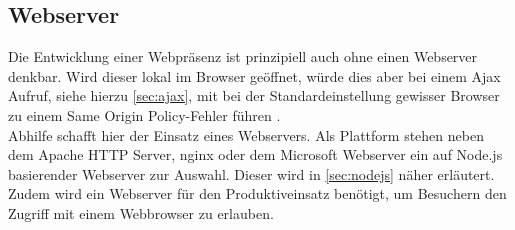 \subsection{Webserver}
\label{sec:webserver}
Die Entwicklung einer Webpräsenz ist prinzipiell auch ohne einen Webserver denkbar. Wird dieser lokal im Browser geöffnet, würde dies aber bei einem Ajax Aufruf, siehe hierzu \autoref{sec:ajax}, mit bei der Standardeinstellung gewisser Browser zu einem Same Origin Policy-Fehler führen \cite[S. 45  f.]{ste15}.\\
Abhilfe schafft hier der Einsatz eines Webservers. Als Plattform stehen neben dem Apache HTTP Server, nginx oder dem Microsoft Webserver ein auf Node.js basierender Webserver zur Auswahl. Dieser wird in \autoref{sec:nodejs} näher erläutert. \\
Zudem wird ein Webserver für den Produktiveinsatz benötigt, um Besuchern den Zugriff mit einem Webbrowser zu erlauben.
